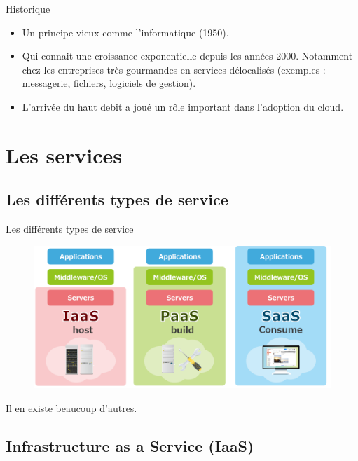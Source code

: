 \documentclass{beamer}
\begin{document}
\begin{frame}{Historique}
    \begin{itemize}
        \item {
        Un principe vieux comme l'informatique (1950).
        }\pause
        \item {
        Qui connait une croissance exponentielle depuis les années 2000.
        Notamment chez les entreprises très gourmandes en services délocalisés (exemples : messagerie, fichiers, logiciels de gestion).
        }\pause
        \item {
        L'arrivée du haut debit a joué un rôle important dans l'adoption du cloud.
        }
    \end{itemize}
\end{frame}

\section{Les services}

\subsection{Les différents types de service}

\begin{frame}{Les différents types de service}
    \begin{figure}[h]
        \includegraphics[width=\textwidth]{images/services.png}
    \end{figure}

    Il en existe beaucoup d'autres.
\end{frame}

\subsection{Infrastructure as a Service (IaaS)}
\end{document}
